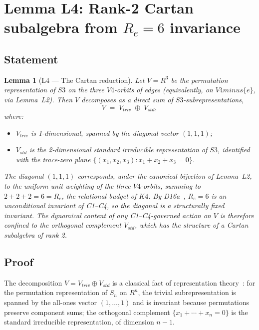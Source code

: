 \documentclass[11pt,a4paper]{article}
\def\Vfour{V4}%
\def\Sthree{S3}%
\def\Kfour{K4}%
\def\Re{Re}%
\def\cong{=}%
\def\setminus{ minus }%
\def\RR{R}%
\def\mathbb#1{#1}%
\def\mathrm#1{#1}%
\theoremstyle{plain}
\newtheorem{lemma}[theorem]{Lemma}
\theoremstyle{definition}
\theoremstyle{remark}
\newcommand{\Kfour}{K_4}
\newcommand{\Vfour}{V_4}
\newcommand{\Sthree}{S_3}
\renewcommand{\Re}{R_e}
\newcommand{\RR}{\mathbb{R}}
\begin{document}
\section{Lemma L4: Rank-2 Cartan subalgebra from \texorpdfstring{$\Re = 6$}{Re = 6} invariance}
\label{sec:L4}

\subsection{Statement}

\begin{lemma}[L4 --- The Cartan reduction]
\label{lem:L4}
Let $V \cong \RR^3$ be the permutation representation of $\Sthree$ on the three $\Vfour$-orbits of edges (equivalently, on $\Vfour \setminus \{e\}$, via Lemma~L2). Then $V$ decomposes as a direct sum of $\Sthree$-subrepresentations,
\[
V \;=\; V_{\mathrm{triv}} \;\oplus\; V_{\mathrm{std}},
\]
where:
\begin{itemize}[leftmargin=2em]
\item $V_{\mathrm{triv}}$ is 1-dimensional, spanned by the diagonal vector $(1,1,1)$;
\item $V_{\mathrm{std}}$ is the 2-dimensional standard irreducible representation of $\Sthree$, identified with the trace-zero plane $\{(x_1,x_2,x_3) : x_1 + x_2 + x_3 = 0\}$.
\end{itemize}
The diagonal $(1,1,1)$ corresponds, under the canonical bijection of Lemma~L2, to the uniform unit weighting of the three $\Vfour$-orbits, summing to $2 + 2 + 2 = 6 = \Re$, the relational budget of $\Kfour$. By D16a~\cite{PDL_D16a}, $\Re = 6$ is an unconditional invariant of C1--C4, so the diagonal is a structurally fixed invariant. The dynamical content of any C1--C4-governed action on $V$ is therefore confined to the orthogonal complement $V_{\mathrm{std}}$, which has the structure of a Cartan subalgebra of rank 2.
\end{lemma}

\subsection{Proof}

The decomposition $V = V_{\mathrm{triv}} \oplus V_{\mathrm{std}}$ is a classical fact of representation theory~\cite{Fulton_Harris}: for the permutation representation of $S_n$ on $\RR^n$, the trivial subrepresentation is spanned by the all-ones vector $(1,\ldots,1)$ and is invariant because permutations preserve component sums; the orthogonal complement $\{x_1 + \cdots + x_n = 0\}$ is the standard irreducible representation, of dimension $n-1$.
\end{document}
